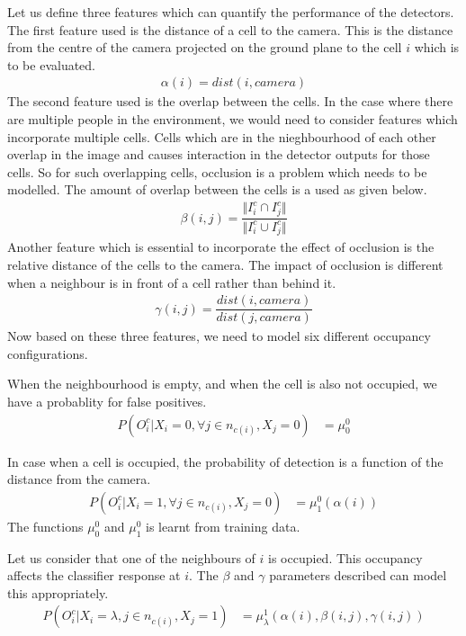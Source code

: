 \documentclass[10pt,twocolumn,letterpaper]{article}
\begin{document}
Let us define three features which can quantify the performance of the detectors. The first feature used is the distance of a cell to the camera.
This is the distance from the centre of the camera projected on the ground plane to the cell $i$ which is to be evaluated.
\begin{align}
\alpha(i) = dist(i,camera)
\end{align}
The second feature used is the overlap between the cells. In the case where there are multiple people in the environment, we would need to consider features which incorporate multiple cells. Cells which are in the nieghbourhood of each other overlap in the image and causes interaction in the detector outputs for those cells. So for such overlapping cells, occlusion is a problem which needs to be modelled. The amount of overlap between the cells is a used as given below. 
\begin{align}
\beta(i,j) = \dfrac{\Vert I_{i}^{c} \cap I_{j}^{c} \Vert}{\Vert I_{i}^{c} \cup I_{j}^{c} \Vert}
\end{align}
Another feature which is essential to incorporate the effect of occlusion is the relative distance of the cells to the camera. 
The impact of occlusion is different when a neighbour is in front of a cell rather than behind it. 
\begin{align}
\gamma(i,j) = \dfrac{dist(i,camera)}{dist(j,camera)}
\end{align}
Now based on these three features, we need to model six different occupancy configurations.  

When the neighbourhood is empty, and when the cell is also not occupied, we have a probablity for false positives.
\begin{align}
 P(O^{c}_{i} |X_{i}=0 ,\forall j \in{n_{c(i)}},X_{j} =0)  &=\mu^{0}_{0}
\end{align}

In case when a cell is occupied, the probability of detection is a function of the distance from the camera. 
\begin{align}
 P(O^{c}_{i} |X_{i}=1 ,\forall j \in{n_{c(i)}},X_{j} =0)  &=\mu^{0}_{1}(\alpha(i))
\end{align}
The functions $ \mu^{0}_{0} $  and $ \mu^{0}_{1} $ is learnt from training data.

Let us consider that one of the neighbours of $ i$ is occupied. This occupancy affects the classifier response at $ i$. The $\beta$ and $\gamma$ parameters described can model this appropriately.
 \begin{align}
 P(O^{c}_{i} |X_{i}=\lambda , j \in{n_{c(i)}},X_{j} =1)  &=\mu^{1}_{\lambda}(     \alpha(i),\beta(i,j),\gamma(i,j))
\end{align}
\end{document}
